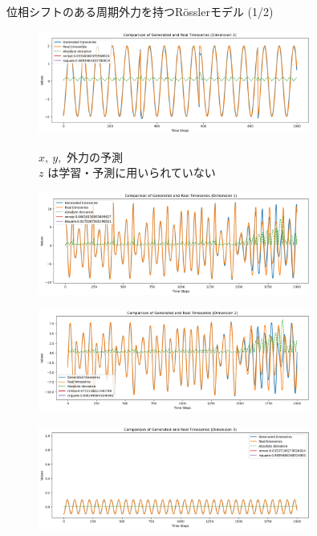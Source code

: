 \begin{frame}{位相シフトのある周期外力を持つRösslerモデル (1/2)}
\begin{minipage}{0.49\textwidth}
        \begin{figure}
            \includegraphics[width=0.8\textwidth]{Fig/custard3.png}
            \label{custard_3.png} %
            \caption{$x,\ y,$ 外力の予測\\ $z$ は学習・予測に用いられていない}
        \end{figure}
        \vspace{-1.0cm}
        \end{minipage}
    \begin{minipage}{0.5\textwidth}
        \begin{figure}
            \includegraphics[width=0.8\textwidth]{Fig/rossler_+sin_1.png}
            \label{rossler_+sin_1.png} %
        \end{figure}
        \vspace{-1.0cm}
        \begin{figure}
            \includegraphics[width=0.8\textwidth]{Fig/rossler_+sin_2.png}
            \label{rossler_+sin_2.png} %
        \end{figure}
        \vspace{-1.0cm}
        \begin{figure}
            \includegraphics[width=0.8\textwidth]{Fig/rossler_+sin_3.png}

\end{figure}
\end{minipage}
\end{frame}
